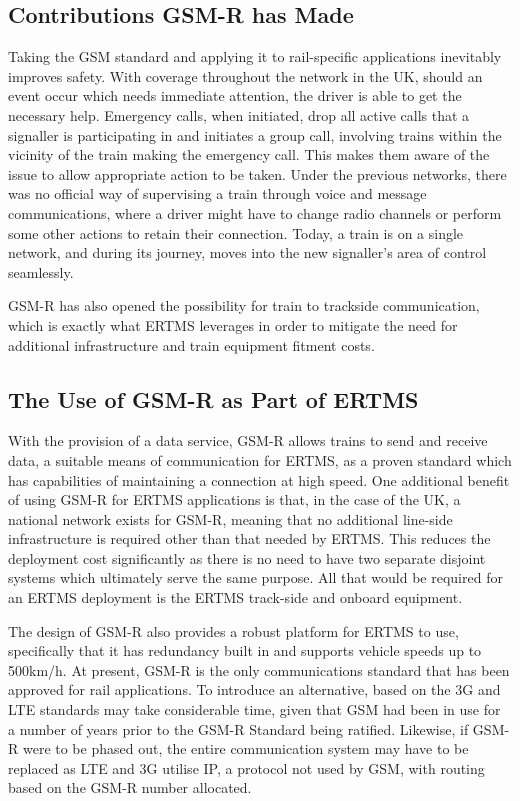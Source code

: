 \documentclass[twoside,11pt,a4paper]{article}
\begin{document}
\subsection{Contributions GSM-R has Made}
Taking the GSM standard and applying it to rail-specific applications inevitably improves safety. With coverage throughout the network in the UK, should an event occur which needs immediate attention, the driver is able to get the necessary help. Emergency calls, when initiated, drop all active calls that a signaller is participating in and initiates a group call, involving trains within the vicinity of the train making the emergency call. This makes them aware of the issue to allow appropriate action to be taken. Under the previous networks, there was no official way of supervising a train through voice and message communications, where a driver might have to change radio channels or perform some other actions to retain their connection. Today, a train is on a single network, and during its journey, moves into the new signaller's area of control seamlessly.

GSM-R has also opened the possibility for train to trackside communication, which is exactly what ERTMS leverages in order to mitigate the need for additional infrastructure and train equipment fitment costs.


\subsection{The Use of GSM-R as Part of ERTMS}
With the provision of a data service, GSM-R allows trains to send and receive data, a suitable means of communication for ERTMS, as a proven standard which has capabilities of maintaining a connection at high speed.
One additional benefit of using GSM-R for ERTMS applications is that, in the case of the UK, a national network exists for GSM-R, meaning that no additional line-side infrastructure is required other than that needed by ERTMS. This reduces the deployment cost significantly as there is no need to have two separate disjoint systems which ultimately serve the same purpose. All that would be required for an ERTMS deployment is the ERTMS track-side and onboard equipment.

The design of GSM-R also provides a robust platform for ERTMS to use, specifically that it has redundancy built in and supports vehicle speeds up to 500km/h. At present, GSM-R is the only communications standard that has been approved for rail applications. To introduce an alternative, based on the 3G and LTE standards may take considerable time, given that GSM had been in use for a number of years prior to the GSM-R Standard being ratified. Likewise, if GSM-R were to be phased out, the entire communication system may have to be replaced as LTE and 3G utilise IP, a protocol not used by GSM, with routing based on the GSM-R number allocated.
\end{document}
